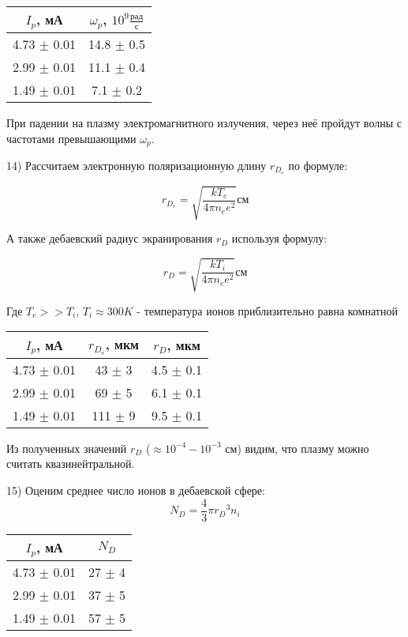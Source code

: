 \documentclass[a4paper,12pt]{article}
\begin{document}
\begin{center}
\begin{tabular}{|c|c|}
	\hline
	$I_p$, мА & ${\omega}_p$, $ 10^{9}\frac{\text{рад}}{\text{с}}$ \\	
	\hline
	4.73 $\pm$ 0.01 & 14.8 $\pm$ 0.5 \\
	\hline
	2.99 $\pm$ 0.01 & 11.1 $\pm$ 0.4 \\
	\hline	
	1.49 $\pm$ 0.01 & 7.1 $\pm$ 0.2 \\
	\hline
\end{tabular}
\end{center}

При падении на плазму электромагнитного излучения, через неё пройдут волны с частотами превышающими ${\omega}_p$.\\

\par14) Рассчитаем электронную поляризационную длину $r_{D_e}$ по формуле: 

$$ r_{D_e} = \sqrt{\frac{k T_e}{4\pi n_e e^2}} \text{см} $$

А также дебаевский радиус экранирования $r_D$ используя формулу:

$$ r_D = \sqrt{\frac{k T_i}{4\pi n_e e^2}} \text{см} $$

Где $T_e >> T_i$, $T_i \approx 300K$ - температура ионов приблизительно равна комнатной\\

\begin{center}
\begin{tabular}{|c|c|c|}
	\hline
	$I_p$, мА & $r_{D_e}$, мкм & $r_D$, мкм\\
    \hline
    4.73 $\pm$ 0.01 & 43 $\pm$ 3 & 4.5 $\pm$ 0.1 \\
    \hline
    2.99 $\pm$ 0.01 & 69 $\pm$ 5 & 6.1 $\pm$ 0.1 \\
    \hline
    1.49 $\pm$ 0.01 & 111 $\pm$ 9 & 9.5 $\pm$ 0.1 \\
	\hline
\end{tabular}
\end{center}

Из полученных значений $r_D$ ($\approx 10^{-4}-10^{-3}$ см) видим, что плазму можно считать квазинейтральной.\\

\par15) Оценим среднее число ионов в дебаевской сфере:\\

$$ N_D = \frac{4}{3}\pi{r_D}^3n_i$$

\begin{center}
\begin{tabular}{|c|c|}
	\hline
	$I_p$, мА & $N_D$\\
	\hline
	4.73 $\pm$ 0.01 & 27 $\pm$ 4\\ 
	\hline
	2.99 $\pm$ 0.01 & 37 $\pm$ 5\\
	\hline
	1.49 $\pm$ 0.01 & 57 $\pm$ 5\\
	\hline
\end{tabular}
\end{center}
\end{document}
